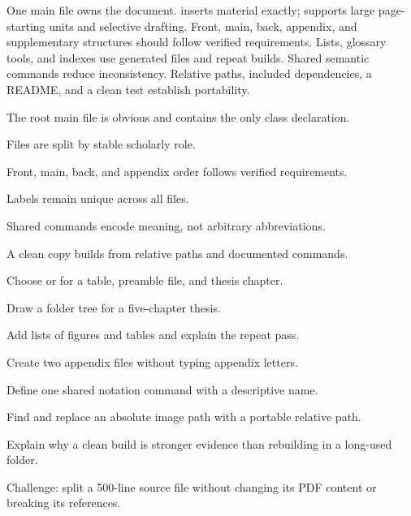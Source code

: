 \chaptersummary

One main file owns the document.  inserts material exactly;
 supports large page-starting units and selective drafting.
Front, main, back, appendix, and supplementary structures should follow
verified requirements. Lists, glossary tools, and indexes use generated files
and repeat builds. Shared semantic commands reduce inconsistency. Relative
paths, included dependencies, a README, and a clean test establish portability.

\chaptercheck
\begin{chapterchecklist}
  \item The root main file is obvious and contains the only class declaration.
  \item Files are split by stable scholarly role.
  \item Front, main, back, and appendix order follows verified requirements.
  \item Labels remain unique across all files.
  \item Shared commands encode meaning, not arbitrary abbreviations.
  \item A clean copy builds from relative paths and documented commands.
\end{chapterchecklist}

\chapterexercisestitle
\begin{chapterexercises}
  \item Choose  or  for a table, preamble file, and
        thesis chapter.
  \item Draw a folder tree for a five-chapter thesis.
  \item Add lists of figures and tables and explain the repeat pass.
  \item Create two appendix files without typing appendix letters.
  \item Define one shared notation command with a descriptive name.
  \item Find and replace an absolute image path with a portable relative path.
  \item Explain why a clean build is stronger evidence than rebuilding in a
        long-used folder.
  \item Challenge: split a 500-line source file without changing its PDF
        content or breaking its references.
\end{chapterexercises}
